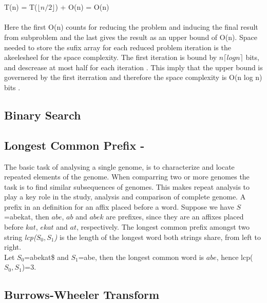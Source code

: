 \documentclass[12pt]{article} %
\begin{document}
\\ \\
T(n) = T($\lfloor n/2 \rfloor$) + O(n) = O(n)
\\ \\
Here the first O(n) counts for reducing the problem and inducing the final result from subproblem \cite{twoeffecient} and the last gives the result as an upper bound of O(n).
Space needed to store the sufix array for each reduced problem iteration is the akeelesheel for the space complexity. The first iteration is bound by $n \lceil log n \rceil$ bits, and descrease at most half for each iteration . This imply that the upper bound is governered by the first iterration and therefore the space complexity is O(n log n) bits \cite{twoeffecient}.

\subsection{Binary Search} \label{Binary Search Section}

\subsection{Longest Common Prefix - } \label{LCPsection}

The basic task of analysing a single genome, is to characterize and locate repeated elements of the genome. When comparring two or more genomes the task is to find similar subsequences of genomes. This makes repeat analysis to play a key role in the study, analysis and comparison of complete genome. 
A prefix in an definition for an affix placed before a word. Suppose we have $S$=abekat, then $abe$, $ab$ and $abek$ are prefixes, since they are an affixes placed before $kat$, $ekat$ and $at$, respectively. The longest common prefix amongst two string \emph{lcp($S_0, S_1$)} is the length of the longest word both strings share, from left to right. \\
Let $S_0$=abekat\$ and $S_1$=abe, then the longest common word is $abe$, hence lcp($S_0, S_1$)=3.

\subsection{Burrows-Wheeler Transform} \label{Burrows-Wheeler Transform}
\end{document}
